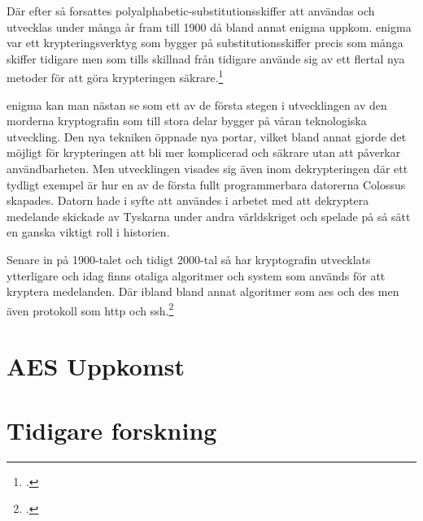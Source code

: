Där efter så forsattes \gls{polyalphabetic-substitutionsskiffer} att användas och utvecklas
under många år fram till 1900 då bland annat \gls{enigma} uppkom. \gls{enigma} var ett krypteringsverktyg som
bygger på \gls{substitutionsskiffer} precis som många skiffer tidigare men som tills skillnad från tidigare
använde sig av ett flertal nya metoder för att göra krypteringen säkrare.\footcite{kryptografi-historia-1}

\gls{enigma} kan man nästan se som ett av de första stegen i utvecklingen av den morderna kryptografin som
till stora delar bygger på våran teknologiska utveckling. Den nya tekniken öppnade nya portar, vilket bland annat gjorde det möjligt
för krypteringen att bli mer komplicerad och säkrare utan att påverkar användbarheten. Men utvecklingen visades sig även inom
dekrypteringen där ett tydligt exempel är hur en av de första fullt programmerbara datorerna Colossus skapades. Datorn hade i syfte
att användes i arbetet med att dekryptera medelande skickade av Tyskarna under andra världskriget och spelade på så sätt
en ganska viktigt roll i historien.

Senare in på 1900-talet och tidigt 2000-tal så har kryptografin utvecklats ytterligare och idag finns otaliga
algoritmer och system som används för att kryptera medelanden. Där ibland bland annat algoritmer som \gls{aes} och \gls{des} men även
protokoll som \gls{http} och \gls{ssh}.\footcite{krypto}

\section{AES Uppkomst} %
\label{sec:aes-uppkomst}

\section{Tidigare forskning} %
\label{sec:tidigare-forskning}

